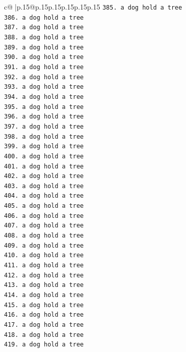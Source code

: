 \documentclass{article}
\begin{document}
{\begin{supertabular}{c@{$\;$}|p{.15\linewidth}@{}p{.15\linewidth}p{.15\linewidth}p{.15\linewidth}p{.15\linewidth}p{.15\linewidth}}
{{{\texttt{385. a dog hold a tree} \\
\texttt{386. a dog hold a tree} \\
\texttt{387. a dog hold a tree} \\
\texttt{388. a dog hold a tree} \\
\texttt{389. a dog hold a tree} \\
\texttt{390. a dog hold a tree} \\
\texttt{391. a dog hold a tree} \\
\texttt{392. a dog hold a tree} \\
\texttt{393. a dog hold a tree} \\
\texttt{394. a dog hold a tree} \\
\texttt{395. a dog hold a tree} \\
\texttt{396. a dog hold a tree} \\
\texttt{397. a dog hold a tree} \\
\texttt{398. a dog hold a tree} \\
\texttt{399. a dog hold a tree} \\
\texttt{400. a dog hold a tree} \\
\texttt{401. a dog hold a tree} \\
\texttt{402. a dog hold a tree} \\
\texttt{403. a dog hold a tree} \\
\texttt{404. a dog hold a tree} \\
\texttt{405. a dog hold a tree} \\
\texttt{406. a dog hold a tree} \\
\texttt{407. a dog hold a tree} \\
\texttt{408. a dog hold a tree} \\
\texttt{409. a dog hold a tree} \\
\texttt{410. a dog hold a tree} \\
\texttt{411. a dog hold a tree} \\
\texttt{412. a dog hold a tree} \\
\texttt{413. a dog hold a tree} \\
\texttt{414. a dog hold a tree} \\
\texttt{415. a dog hold a tree} \\
\texttt{416. a dog hold a tree} \\
\texttt{417. a dog hold a tree} \\
\texttt{418. a dog hold a tree} \\
\texttt{419. a dog hold a tree} \\
}}}
\end{supertabular}}
\end{document}
